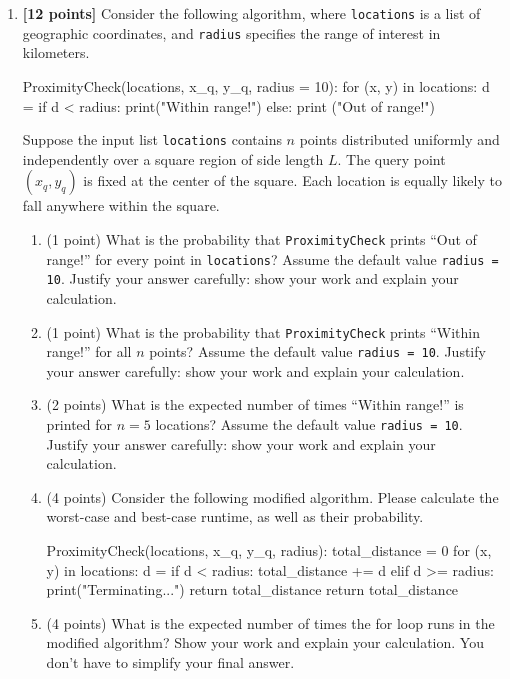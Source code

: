 \documentclass{assignment-263}
\begin{document}
\think
\begin{enumerate}
\item \textbf{[12 points]}
Consider the following algorithm, where \texttt{locations} is a list of geographic coordinates, and \texttt{radius} specifies the range of interest in kilometers.

\begin{python}
ProximityCheck(locations, x_q, y_q, radius = 10):
  for (x, y) in locations:
    d =  
    if d < radius:
      print("Within range!")
    else:
      print ("Out of range!")
\end{python}

Suppose the input list \texttt{locations} contains $n$ points distributed uniformly and independently over a square region of side length $L$. The query point $(x_q, y_q)$ is fixed at the center of the square. Each location is equally likely to fall anywhere within the square.

\begin{enumerate}
    \item (1 point) What is the probability that \texttt{ProximityCheck} prints ``Out of range!'' for every point in \texttt{locations}? Assume the default value \texttt{radius = 10}. Justify your answer carefully: show your work and explain your calculation.
    
    \item (1 point) What is the probability that \texttt{ProximityCheck} prints ``Within range!'' for all $n$ points? Assume the default value \texttt{radius = 10}. Justify your answer carefully: show your work and explain your calculation.
    
    \item (2 points) What is the expected number of times ``Within range!'' is printed for $n=5$ locations? Assume the default value \texttt{radius = 10}. Justify your answer carefully: show your work and explain your calculation.
    
    \item (4 points) Consider the following modified algorithm. Please calculate the worst-case and best-case runtime, as well as their probability.
    
    \begin{python}
ProximityCheck(locations, x_q, y_q, radius):
  total_distance = 0
  for (x, y) in locations:
    d =  
    if d < radius:
      total_distance += d
    elif d >= radius:
      print("Terminating...")
      return total_distance
  return total_distance
\end{python}

    \item (4 points) What is the expected number of times the for loop runs in the modified algorithm? Show your work and explain your calculation. You don't have to simplify your final answer.
    
\end{enumerate}

\end{enumerate}
\end{document}
